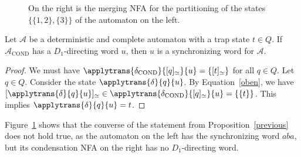 \begin{figure}[ht]
    \centering
    \hspace{8em}
    \caption{On the right is the merging NFA for the partitioning of the states
    $\{\{1,2\}, \{3\}\}$ of the automaton on the left.
    }
    \label{constr_sync:fig:merging_NFA}
\end{figure}

\begin{proposition}
\label{constr_sync:prop:D1-directing-implies-sync}
 Let $\mathcal A$ be a deterministic and complete automaton with a trap state $t \in Q$.
 If $\mathcal A_{\text{COND}}$ has a $D_1$-directing word $u$,
 then $u$ is a synchronizing word for $\mathcal A$.
\end{proposition}
\begin{proof}
 We must have $\applytrans{\delta_{\text{COND}}}{[q]_{\simeq}}{u} = \{ [t]_{\simeq} \}$
 for all $q \in Q$.
 Let $q \in Q$.
 Consider the state $\applytrans{\delta}{q}{u}$.
 By Equation~\eqref{oben},
 we have $[\applytrans{\delta}{q}{u}]_{\simeq} \in \applytrans{\delta_{\text{COND}}}{[q]_{\simeq}}{u} = \{ \{t\}\}$.
 This implies $\applytrans{\delta}{q}{u} = t$.
\end{proof}

Figure~\ref{constr_sync:fig:merging_NFA} shows that the converse of the statement
from Proposition~\ref{previous} does not hold true, as the automaton on the left
has the synchronizing word $aba$, but its condensation NFA on the right 
has no $D_1$-directing word.


